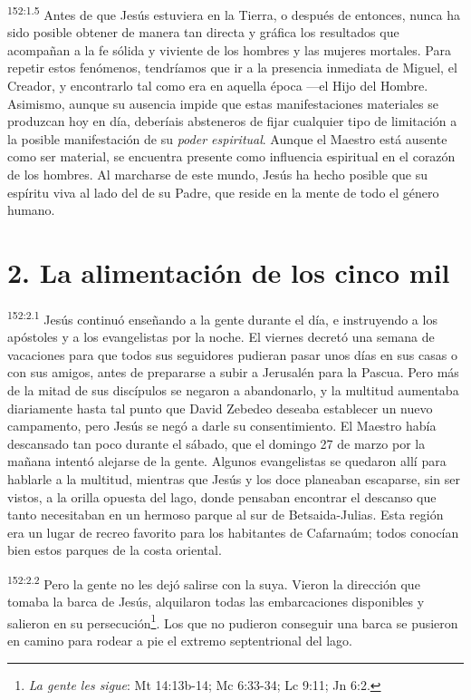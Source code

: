 \par 
\textsuperscript{152:1.5} Antes de que Jesús estuviera en la Tierra, o después de entonces, nunca ha sido posible obtener de manera tan directa y gráfica los resultados que acompañan a la fe sólida y viviente de los hombres y las mujeres mortales. Para repetir estos fenómenos, tendríamos que ir a la presencia inmediata de Miguel, el Creador, y encontrarlo tal como era en aquella época ---el Hijo del Hombre. Asimismo, aunque su ausencia impide que estas manifestaciones materiales se produzcan hoy en día, deberíais absteneros de fijar cualquier tipo de limitación a la posible manifestación de su \textit{poder espiritual}. Aunque el Maestro está ausente como ser material, se encuentra presente como influencia espiritual en el corazón de los hombres. Al marcharse de este mundo, Jesús ha hecho posible que su espíritu viva al lado del de su Padre, que reside en la mente de todo el género humano.

\section*{2. La alimentación de los cinco mil}
\par 
\textsuperscript{152:2.1} Jesús continuó enseñando a la gente durante el día, e instruyendo a los apóstoles y a los evangelistas por la noche. El viernes decretó una semana de vacaciones para que todos sus seguidores pudieran pasar unos días en sus casas o con sus amigos, antes de prepararse a subir a Jerusalén para la Pascua. Pero más de la mitad de sus discípulos se negaron a abandonarlo, y la multitud aumentaba diariamente hasta tal punto que David Zebedeo deseaba establecer un nuevo campamento, pero Jesús se negó a darle su consentimiento. El Maestro había descansado tan poco durante el sábado, que el domingo 27 de marzo por la mañana intentó alejarse de la gente. Algunos evangelistas se quedaron allí para hablarle a la multitud, mientras que Jesús y los doce planeaban escaparse, sin ser vistos, a la orilla opuesta del lago, donde pensaban encontrar el descanso que tanto necesitaban en un hermoso parque al sur de Betsaida-Julias. Esta región era un lugar de recreo favorito para los habitantes de Cafarnaúm; todos conocían bien estos parques de la costa oriental.

\par 
\textsuperscript{152:2.2} Pero la gente no les dejó salirse con la suya. Vieron la dirección que tomaba la barca de Jesús, alquilaron todas las embarcaciones disponibles y salieron en su persecución\footnote{\textit{La gente les sigue}: Mt 14:13b-14; Mc 6:33-34; Lc 9:11; Jn 6:2.}. Los que no pudieron conseguir una barca se pusieron en camino para rodear a pie el extremo septentrional del lago.

